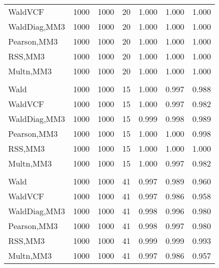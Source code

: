 \documentclass[
]{article}
\begin{document}
\begin{table}[H]
{\begin{tabular}[t]{lrrrrrr}
\hspace{1em}WaldVCF & 1000 & 1000 & 20 & 1.000 & 1.000 & 1.000\\
\hspace{1em}WaldDiag,MM3 & 1000 & 1000 & 20 & 1.000 & 1.000 & 1.000\\
\hspace{1em}Pearson,MM3 & 1000 & 1000 & 20 & 1.000 & 1.000 & 1.000\\
\hspace{1em}RSS,MM3 & 1000 & 1000 & 20 & 1.000 & 1.000 & 1.000\\
\hspace{1em}Multn,MM3 & 1000 & 1000 & 20 & 1.000 & 1.000 & 1.000\\
\addlinespace[0.3em]
\multicolumn{7}{l}{\textbf{2F 10V}}\\
\hspace{1em}Wald & 1000 & 1000 & 15 & 1.000 & 0.997 & 0.988\\
\hspace{1em}WaldVCF & 1000 & 1000 & 15 & 1.000 & 0.997 & 0.982\\
\hspace{1em}WaldDiag,MM3 & 1000 & 1000 & 15 & 0.999 & 0.998 & 0.989\\
\hspace{1em}Pearson,MM3 & 1000 & 1000 & 15 & 1.000 & 1.000 & 0.998\\
\hspace{1em}RSS,MM3 & 1000 & 1000 & 15 & 1.000 & 1.000 & 1.000\\
\hspace{1em}Multn,MM3 & 1000 & 1000 & 15 & 1.000 & 0.997 & 0.982\\
\addlinespace[0.3em]
\multicolumn{7}{l}{\textbf{3F 15V}}\\
\hspace{1em}Wald & 1000 & 1000 & 41 & 0.997 & 0.989 & 0.960\\
\hspace{1em}WaldVCF & 1000 & 1000 & 41 & 0.997 & 0.986 & 0.958\\
\hspace{1em}WaldDiag,MM3 & 1000 & 1000 & 41 & 0.998 & 0.996 & 0.980\\
\hspace{1em}Pearson,MM3 & 1000 & 1000 & 41 & 0.998 & 0.997 & 0.980\\
\hspace{1em}RSS,MM3 & 1000 & 1000 & 41 & 0.999 & 0.999 & 0.993\\
\hspace{1em}Multn,MM3 & 1000 & 1000 & 41 & 0.997 & 0.986 & 0.957\\
\bottomrule
\end{tabular}}
\endgroup{}
\end{table}
\end{document}
